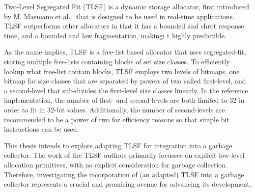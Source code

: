 
Two-Level Segregated Fit (TLSF) is a dynamic storage allocator, first introduced by M. Masmano et al.~\cite{TLSF} that is designed to be used in real-time applications. TLSF outperforms other allocators in that it has a bounded and shrot response time, and a bounded and low fragmentation, makingi t highly predictible.

As the name implies, TLSF is a free-list based allocator that uses segregated-fit, storing multiple free-lists containing blocks of set size classes. To efficiently lookup what free-list contain blocks, TLSF employs two levels of bitmaps, one bitmap for size classes that are separated by powers of two called first-level, and a second-level that sub-divides the first-level size classes linearly. In the reference implementation, the number of first- and second-levels are both limited to 32 in order to fit in 32-bit values. Additionally, the number of second-levels are recommended to be a power of two for efficiency reasons so that simple bit instructions can be used.

This thesis intends to explore adapting TLSF for integration into a garbage collector. The work of the TLSF authors primarily focusses on explicit low-level allocation primitives, with no explicit consideration for garbage collection. Therefore, investigating the incorporation of (an adapted) TLSF into a garbage collector represents a crucial and promising avenue for advancing its development.

